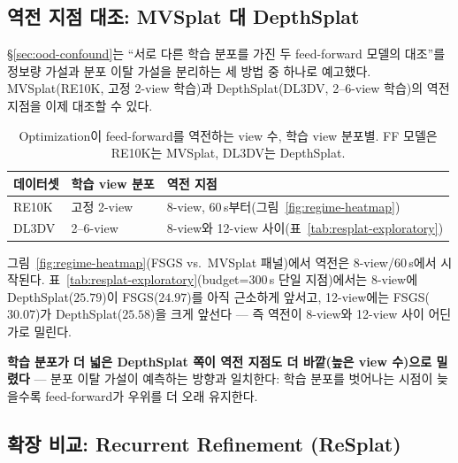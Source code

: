 \subsection{역전 지점 대조: MVSplat 대 DepthSplat}
\label{sec:reversal-comparison}

\S\ref{sec:ood-confound}는 ``서로 다른 학습 분포를 가진 두 feed-forward 모델의 대조''를 정보량 가설과 분포 이탈 가설을 분리하는 세 방법 중 하나로 예고했다. MVSplat(RE10K, 고정 2-view 학습)과 DepthSplat(DL3DV, 2--6-view 학습)의 역전 지점을 이제 대조할 수 있다.

\begin{table}[h]
\centering
\caption{Optimization이 feed-forward를 역전하는 view 수, 학습 view 분포별. FF 모델은 RE10K는 MVSplat, DL3DV는 DepthSplat.}
\label{tab:reversal-comparison}
\small
\begin{tabular}{@{}l l L{2.6cm}@{}}
\toprule
데이터셋 & 학습 view 분포 & 역전 지점 \\
\midrule
RE10K & 고정 2-view & 8-view, 60\,s부터(그림~\ref{fig:regime-heatmap}) \\
DL3DV & 2--6-view & 8-view와 12-view 사이(표~\ref{tab:resplat-exploratory}) \\
\bottomrule
\end{tabular}
\end{table}

그림~\ref{fig:regime-heatmap}(FSGS vs.\ MVSplat 패널)에서 역전은 8-view/60\,s에서 시작된다. 표~\ref{tab:resplat-exploratory}(budget=300\,s 단일 지점)에서는 8-view에 DepthSplat($25.79$)이 FSGS($24.97$)를 아직 근소하게 앞서고, 12-view에는 FSGS($30.07$)가 DepthSplat($25.58$)을 크게 앞선다 — 즉 역전이 8-view와 12-view 사이 어딘가로 밀린다.

\textbf{학습 분포가 더 넓은 DepthSplat 쪽이 역전 지점도 더 바깥(높은 view 수)으로 밀렸다} — 분포 이탈 가설이 예측하는 방향과 일치한다: 학습 분포를 벗어나는 시점이 늦을수록 feed-forward가 우위를 더 오래 유지한다.


\subsection{확장 비교: Recurrent Refinement (ReSplat)}
\label{sec:resplat-exploratory}

